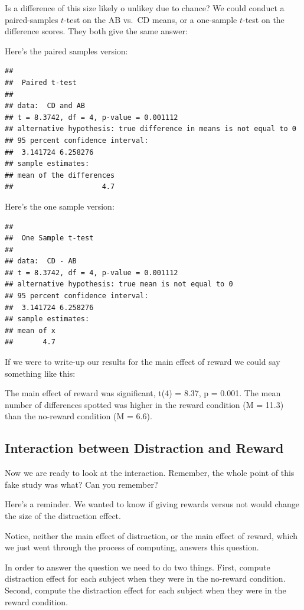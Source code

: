 \documentclass[]{book}
\begin{document}
Is a difference of this size likely o unlikey due to chance? We could conduct a paired-samples \(t\)-test on the AB vs.~CD means, or a one-sample \(t\)-test on the difference scores. They both give the same answer:

Here's the paired samples version:

\begin{verbatim}
## 
## 	Paired t-test
## 
## data:  CD and AB
## t = 8.3742, df = 4, p-value = 0.001112
## alternative hypothesis: true difference in means is not equal to 0
## 95 percent confidence interval:
##  3.141724 6.258276
## sample estimates:
## mean of the differences 
##                     4.7
\end{verbatim}

Here's the one sample version:

\begin{verbatim}
## 
## 	One Sample t-test
## 
## data:  CD - AB
## t = 8.3742, df = 4, p-value = 0.001112
## alternative hypothesis: true mean is not equal to 0
## 95 percent confidence interval:
##  3.141724 6.258276
## sample estimates:
## mean of x 
##       4.7
\end{verbatim}

If we were to write-up our results for the main effect of reward we could say something like this:

The main effect of reward was significant, t(4) = 8.37, p = 0.001. The mean number of differences spotted was higher in the reward condition (M = 11.3) than the no-reward condition (M = 6.6).

\hypertarget{interaction-between-distraction-and-reward}{%
\subsection{Interaction between Distraction and Reward}\label{interaction-between-distraction-and-reward}}

Now we are ready to look at the interaction. Remember, the whole point of this fake study was what? Can you remember?

Here's a reminder. We wanted to know if giving rewards versus not would change the size of the distraction effect.

Notice, neither the main effect of distraction, or the main effect of reward, which we just went through the process of computing, answers this question.

In order to answer the question we need to do two things. First, compute distraction effect for each subject when they were in the no-reward condition. Second, compute the distraction effect for each subject when they were in the reward condition.
\end{document}
